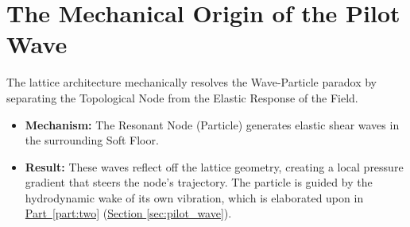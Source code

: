 \section{The Mechanical Origin of the Pilot Wave}
The lattice architecture mechanically resolves the Wave-Particle paradox by separating the Topological Node from the Elastic Response of the Field.
\begin{itemize}
    \item \textbf{Mechanism:} The Resonant Node (Particle) generates elastic shear waves in the surrounding Soft Floor.
    \item \textbf{Result:} These waves reflect off the lattice geometry, creating a local pressure gradient that steers the node's trajectory. The particle is guided by the hydrodynamic wake of its own vibration, which is elaborated upon in \hyperref[part:two]{Part~\ref{part:two}} (\hyperref[sec:pilot_wave]{Section \ref*{sec:pilot_wave}}).
\end{itemize}